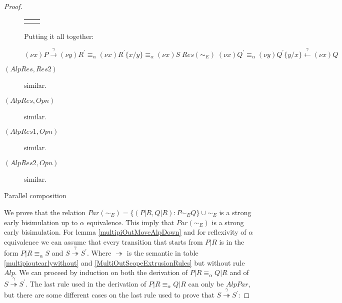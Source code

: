 \begin{lemma}
\begin{proof}
\begin{description}
\begin{center}
\begin{tabular}{ll}
		&
	      \\
	      \end{tabular}
	    \end{center}
	    Putting it all together:
 	    \begin{center}
 	      $(\nu x)P \xrightarrow{\gamma} (\nu y)R^{'} \equiv_{\alpha} (\nu x)R^{'}\{x/y\}  \equiv_{\alpha} (\nu x)S\; Res(\sim_{E})\; (\nu x)Q^{'} \equiv_{\alpha} (\nu y)Q^{'}\{y/x\}  \stackrel{\gamma}{\leftarrow} (\nu x)Q$
 	    \end{center}
 	  \item[$(AlpRes, Res2)$] similar.
  	  \item[$(AlpRes, Opn)$] similar.
  	  \item[$(AlpRes1, Opn)$] similar.
  	  \item[$(AlpRes2, Opn)$] similar.
	\end{description}
    \begin{description}
      \item[Parallel composition]
    \end{description}
    We prove that the relation $Par(\sim_{E})=\{(P|R, Q|R): P\sim_{E} Q\} \cup \sim_{E}$ is a strong early bisimulation up to $\alpha$ equivalence. This imply that $Par(\sim_{E})$ is a strong early bisimulation. For lemma \ref{multipiOutMoveAlpDown} and for reflexivity of $\alpha$ equivalence we can assume that every transition that starts from $P|R$ is in the form $P|R \equiv_{\alpha} S$ and $S\stackrel{\gamma}{\twoheadrightarrow} S^{'}$. Where $\twoheadrightarrow$ is the semantic in table \ref{multipioutearlywithout} and \ref{MultiOutScopeExtrusionRules} but without rule $Alp$. We can proceed by induction on both the derivation of $P|R \equiv_{\alpha} Q|R$ and of $S\stackrel{\gamma}{\twoheadrightarrow} S^{'}$. The last rule used in the derivation of $P|R \equiv_{\alpha} Q|R$ can only be $AlpPar$, but there are some different cases on the last rule used to prove that $S\stackrel{\gamma}{\twoheadrightarrow} S^{'}$:
\end{proof}
\end{lemma}
